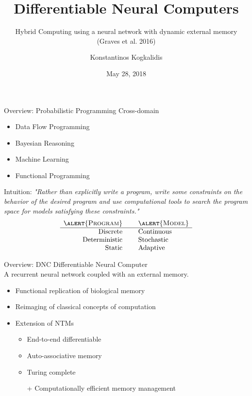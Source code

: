\documentclass{beamer}
\title{Differentiable Neural Computers}
\subtitle{Hybrid Computing using a neural network with dynamic external memory (Graves et al. 2016)}
\author{Konstantinos Kogkalidis}
\date{May 28, 2018}
\institute{Logic and Computation}
\begin{document}
	\maketitle
	
\begin{frame}{Overview: Probabilistic Programming}
	\alert{Cross-domain}
	\begin{itemize}
	\item Data Flow Programming
	\item Bayesian Reasoning
	\item Machine Learning
	\item Functional Programming
	\end{itemize}
	\pause
	Intuition:
	\textit{"Rather than explicitly write a program, write some \alert{constraints} on the behavior of the desired program and use computational tools to search the program space for \alert{models} satisfying these constraints."}
	\pause
	\[\begin{array}{rcl}
	\textsc{\alert{Program}} &\ & \textsc{\alert{Model}}\\
	\hline
	\text{Discrete} &\ & \text{Continuous}\\
	\text{Deterministic} &\ & \text{Stochastic}\\
	\text{Static} &\ & \text{Adaptive}\\
	\end{array}\]
\end{frame}

\begin{frame}{Overview: DNC}
	\alert{Differentiable Neural Computer}\\
	A recurrent neural network coupled with an external memory.
	
	\pause
	\begin{itemize}
	\item Functional replication of biological memory
	\item Reimaging of classical concepts of computation
	\item Extension of NTMs
	\begin{itemize}
		\item End-to-end differentiable
		\item Auto-associative memory
		\item Turing complete
		\item[+] Computationally efficient memory management
	\end{itemize}
	\end{itemize}
\end{frame}
\end{document}
